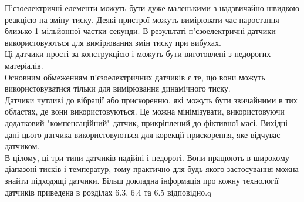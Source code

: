 \documentclass[a4paper,fontsize=12]{report}
\begin{document}
  П'єзоелектричні елементи можуть бути дуже маленькими з надзвичайно швидкою реакцією на зміну тиску. Деякі пристрої можуть вимірювати час наростання близько 1 мільйонної частки секунди. В результаті п'єзоелектричні датчики використовуються для вимірювання змін тиску при вибухах.\\

  Ці датчики прості за конструкцією і можуть бути виготовлені з недорогих матеріалів.\\

  Основним обмеженням п'єзоелектричних датчиків є те, що вони можуть використовуватися тільки для вимірювання динамічного тиску.\\

  Датчики чутливі до вібрації або прискоренню, які можуть бути звичайними в тих областях, де вони використовуються. Це можна мінімізувати, використовуючи додатковий "компенсаційний" датчик, прикріплений до фіктивної масі. Вихідні дані цього датчика використовуються для корекції прискорення, яке відчуває датчиком.\\

  В цілому, ці три типи датчиків надійні і недорогі. Вони працюють в широкому діапазоні тисків і температур, тому практично для будь-якого застосування можна знайти підходящі датчики. Більш докладна інформація про кожну технології датчиків приведена в розділах 6.3, 6.4 та 6.5 відповідно.q

\end{document}
